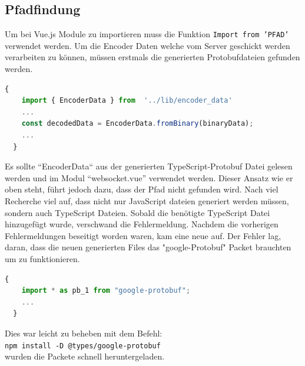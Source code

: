 \subsection{Pfadfindung}
\label{subsubsec:problem_Pfadfindung}
Um bei Vue.js Module zu importieren muss die Funktion \texttt{Import from 'PFAD'} verwendet werden.
%
Um die Encoder Daten welche vom Server geschickt werden verarbeiten zu können, 
müssen erstmals die generierten Protobufdateien gefunden werden.
%
\begin{lstlisting}[language=JavaScript,gobble=4]
  {
    import { EncoderData } from  '../lib/encoder_data'
    ...
    const decodedData = EncoderData.fromBinary(binaryData);
    ...
  }
\end{lstlisting}
Es sollte ``EncoderData`` aus der generierten TypeScript-Protobuf Datei gelesen werden und im Modul ``websocket.vue'' verwendet werden.
Dieser Ansatz wie er oben steht, führt jedoch dazu, dass der Pfad nicht gefunden wird. 
%
Nach viel Recherche viel auf, dass nicht nur JavaScript dateien generiert werden müssen, sondern auch TypeScript Dateien.
Sobald die benötigte TypeScript Datei hinzugefügt wurde, verschwand die Fehlermeldung.
%
Nachdem die vorherigen Fehlermeldungen beseitigt worden waren, kam eine neue auf. 
Der Fehler lag, daran, dass die neuen generierten Files das "google-Protobuf" Packet brauchten um zu funktionieren.
% 
\begin{lstlisting}[language=JavaScript,gobble=4]
  {
    import * as pb_1 from "google-protobuf";
    ...
  }
\end{lstlisting}
Dies war leicht zu beheben mit dem Befehl:\\ \texttt{npm install -D @types/google-protobuf} \\ wurden die Packete schnell
heruntergeladen.

